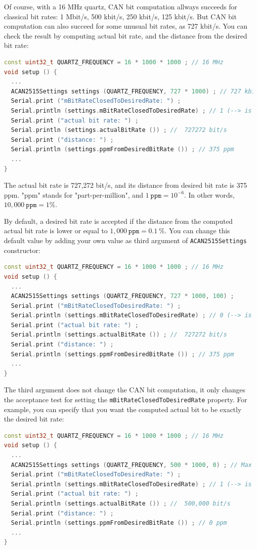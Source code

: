 \documentclass[10pt, a4paper, obeyspaces, openany]{extarticle}
\begin{document}
Of course, with a 16 MHz quartz, CAN bit computation allways succeeds for classical bit rates: 1 Mbit/s, 500 kbit/s, 250 kbit/s, 125 kbit/s. But CAN bit computation can also succeed for some unusual bit rates, as 727 kbit/s. You can check the result by computing actual bit rate, and the distance from the desired bit rate:
{ \small\begin{lstlisting}[language=c++]
const uint32_t QUARTZ_FREQUENCY = 16 * 1000 * 1000 ; // 16 MHz
void setup () {
  ...
  ACAN2515Settings settings (QUARTZ_FREQUENCY, 727 * 1000) ; // 727 kbit/s
  Serial.print ("mBitRateClosedToDesiredRate: ") ;
  Serial.println (settings.mBitRateClosedToDesiredRate) ; // 1 (--> is true)
  Serial.print ("actual bit rate: ") ;
  Serial.println (settings.actualBitRate ()) ; //  727272 bit/s
  Serial.print ("distance: ") ;
  Serial.println (settings.ppmFromDesiredBitRate ()) ; // 375 ppm
  ...
}
\end{lstlisting}}

The actual bit rate is 727,272 bit/s, and its distance from desired bit rate is 375 ppm. "ppm" stands for "part-per-million", and $1~\texttt{ppm} = 10^{-6}$. In other words, $10,000~\texttt{ppm}=1\%$.


By default, a desired bit rate is accepted if the distance from the computed actual bit rate is lower or equal to $1,000~\texttt{ppm} = 0.1~\%$. You can change this default value by adding your own value as third argument of \texttt{ACAN2515Settings} constructor:
{ \small\begin{lstlisting}[language=c++]
const uint32_t QUARTZ_FREQUENCY = 16 * 1000 * 1000 ; // 16 MHz
void setup () {
  ...
  ACAN2515Settings settings (QUARTZ_FREQUENCY, 727 * 1000, 100) ;
  Serial.print ("mBitRateClosedToDesiredRate: ") ;
  Serial.println (settings.mBitRateClosedToDesiredRate) ; // 0 (--> is false)
  Serial.print ("actual bit rate: ") ;
  Serial.println (settings.actualBitRate ()) ; //  727272 bit/s
  Serial.print ("distance: ") ;
  Serial.println (settings.ppmFromDesiredBitRate ()) ; // 375 ppm
  ...
}
\end{lstlisting}}

The third argument does not change the CAN bit computation, it only changes the acceptance test for setting the \texttt{mBitRateClosedToDesiredRate} property. For example, you can specify that you want the computed actual bit to be exactly the desired bit rate:
{ \small\begin{lstlisting}[language=c++]
const uint32_t QUARTZ_FREQUENCY = 16 * 1000 * 1000 ; // 16 MHz
void setup () {
  ...
  ACAN2515Settings settings (QUARTZ_FREQUENCY, 500 * 1000, 0) ; // Max distance is 0 ppm
  Serial.print ("mBitRateClosedToDesiredRate: ") ;
  Serial.println (settings.mBitRateClosedToDesiredRate) ; // 1 (--> is true)
  Serial.print ("actual bit rate: ") ;
  Serial.println (settings.actualBitRate ()) ; //  500,000 bit/s
  Serial.print ("distance: ") ;
  Serial.println (settings.ppmFromDesiredBitRate ()) ; // 0 ppm
  ...
}
\end{lstlisting}}
\end{document}

